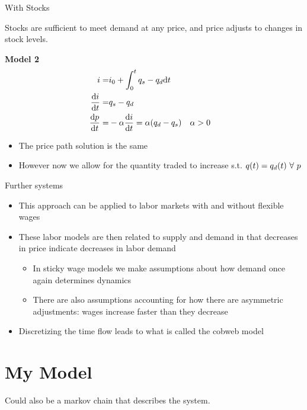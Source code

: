 \documentclass{article}
\begin{document}
With Stocks
	\begin{assumption}
		Stocks are sufficient to meet demand at any price, and price adjusts to changes in stock levels.
	\end{assumption}
	\textbf{Model 2}
	\begin{align*}
		i =& i_0 + \int_0^t{q_s - q_d}\mathrm{d} t\\
		\frac{\mathrm{d} i}{\mathrm{d} t} = & q_s - q_d \\
		\frac{\mathrm{d} p}{\mathrm{d} t} =& -\alpha\frac{\mathrm{d} i}{\mathrm{d} t} = \alpha(q_d - q_s) && \alpha > 0
	\end{align*}	
	\begin{itemize}
		\item The price path solution is the same
		\item However now we allow for the quantity traded to increase s.t. $q(t) = q_d(t)\ \forall\ p$
	\end{itemize}

Further systems
	\begin{itemize}
		\item This approach can be applied to labor markets with and without flexible wages
		\item These labor models are then related to supply and demand in that decreases in price indicate decreases in labor demand
		\begin{itemize}
			\item In sticky wage models we make assumptions about how demand once again determines dynamics
			\item There are also assumptions accounting for how there are asymmetric adjustments: wages increase faster than they decrease
		\end{itemize}
		\item Discretizing the time flow leads to what is called the cobweb model
	\end{itemize}


\section{My Model}
Could also be a markov chain that describes the system.
\end{document}
